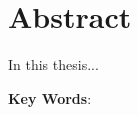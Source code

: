\chapter*{Abstract}

In this thesis...

\vspace{4.5cm}  %

\textbf{Key Words}: 

\clearpage{\thispagestyle{empty}\cleardoublepage}       %






